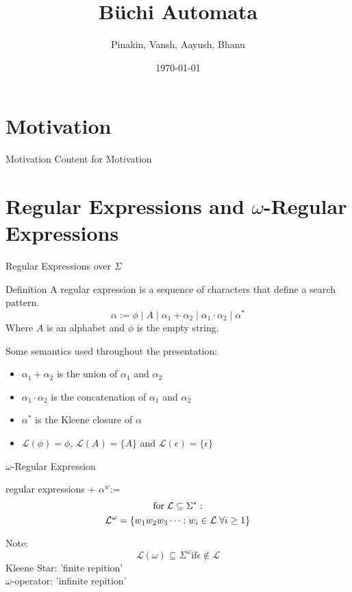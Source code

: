 \documentclass{beamer}
\title{Büchi Automata}
\date{\today}
\author{Pinakin, Vansh, Aayush, Bhanu}
\institute{Indian Institute of Science, Bangalore}
\begin{document}
  \maketitle
  \tableofcontents  
  
  \section{Motivation}
  \begin{frame}{Motivation}
    Content for Motivation
  \end{frame}
  \section{Regular Expressions and $\omega$-Regular Expressions}
  \begin{frame}{Regular Expressions over $\Sigma$}
    \begin{block}{Definition}
      A regular expression is a sequence of characters that define a search pattern.
      \[\alpha := \phi \mid A \mid \alpha_1 + \alpha_2 \mid \alpha_1\cdot\alpha_2 \mid \alpha^*\]
      Where $A$ is an alphabet and $\phi$ is the empty string.
      \end{block}
      Some semantics used throughout the presentation:
      \begin{itemize}
        \item $\alpha_1 + \alpha_2$ is the union of $\alpha_1$ and $\alpha_2$
        \item $\alpha_1\cdot\alpha_2$ is the concatenation of $\alpha_1$ and $\alpha_2$
        \item $\alpha^*$ is the Kleene closure of $\alpha$
        \item $\mathcal{L}(\phi) = \phi$, $\mathcal{L}(A) = \{A\}$ and $\mathcal{L}(\epsilon)= \{\epsilon\}$
      \end{itemize}
  \end{frame}
  \begin{frame}{$\omega$-Regular Expression}
  \begin{definition}
    regular expressions + $\alpha^w$:=
    \[\text{for} \hspace{1mm} \mathcal{L} \subseteq \Sigma^*:\]
    \[\mathcal{L}^{\omega} = \{w_1w_2w_3\cdots: w_i \in \mathcal{L}\hspace{1mm} \forall i \geq 1\} \]
  \end{definition}
  Note: \[\mathcal{L}(\omega) \subseteq \Sigma^{\omega} \text{if} \epsilon \notin \mathcal{L}\]
  Kleene Star: 'finite repition'\\
  $\omega$-operator: 'infinite repition'
  \end{frame}
\end{document}
